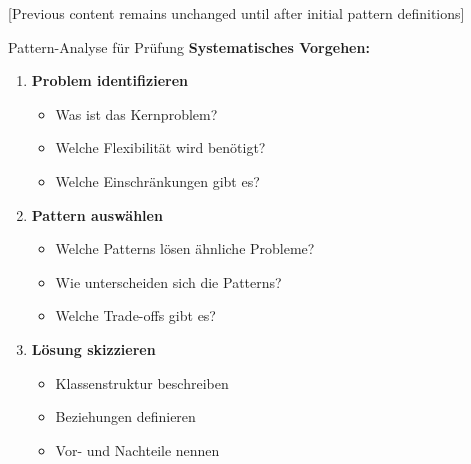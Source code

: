 [Previous content remains unchanged until after initial pattern definitions]

\begin{KR}{Pattern-Analyse für Prüfung}
\textbf{Systematisches Vorgehen:}
\begin{enumerate}
    \item \textbf{Problem identifizieren}
    \begin{itemize}
        \item Was ist das Kernproblem?
        \item Welche Flexibilität wird benötigt?
        \item Welche Einschränkungen gibt es?
    \end{itemize}
    
    \item \textbf{Pattern auswählen}
    \begin{itemize}
        \item Welche Patterns lösen ähnliche Probleme?
        \item Wie unterscheiden sich die Patterns?
        \item Welche Trade-offs gibt es?
    \end{itemize}
    
    \item \textbf{Lösung skizzieren}
    \begin{itemize}
        \item Klassenstruktur beschreiben
        \item Beziehungen definieren
        \item Vor- und Nachteile nennen
    \end{itemize}
\end{enumerate}
\end{KR}

